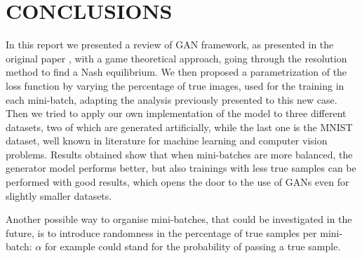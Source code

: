 \section{CONCLUSIONS} \label{conclusions}

In this report we presented a review of GAN framework, as presented in the original paper \cite{NIPS2014_5423}, with a game theoretical approach, going through the resolution method to find a Nash equilibrium. We then proposed a parametrization of the loss function by varying the percentage of true images, used for the training in each mini-batch, adapting the analysis previously presented to this new case. Then we tried to apply our own implementation of the model to three different datasets, two of which are generated artificially, while the last one is the MNIST dataset, well known in literature for machine learning and computer vision problems.
Results obtained show that when mini-batches are more balanced, the generator model performs better, but also trainings with less true samples can be performed with good results, which opens the door to the use of GANs even for slightly smaller datasets.

Another possible way to organise mini-batches, that could be investigated in the future, is to introduce randomness in the percentage of true samples per mini-batch: $\alpha$ for example could stand for the probability of passing a true sample.